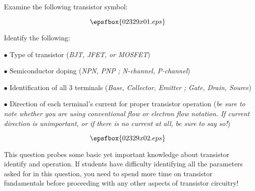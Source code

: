 

Examine the following transistor symbol:

$$\epsfbox{02329x01.eps}$$

\goodbreak

Identify the following:

\medskip
\item{$\bullet$} Type of transistor ({\it BJT, JFET, or MOSFET})
\item{$\bullet$} Semiconductor doping ({\it NPN, PNP ; N-channel, P-channel})
\item{$\bullet$} Identification of all 3 terminals ({\it Base, Collector, Emitter ; Gate, Drain, Source})
\item{$\bullet$} Direction of each terminal's current for proper transistor operation ({\it be sure to note whether you are using conventional flow or electron flow notation.  If current direction is unimportant, or if there is no current at all, be sure to say so!})
\medskip







$$\epsfbox{02329x02.eps}$$







This question probes some basic yet important knowledge about transistor identify and operation.  If students have difficulty identifying all the parameters asked for in this question, you need to spend more time on transistor fundamentals before proceeding with any other aspects of transistor circuitry!




